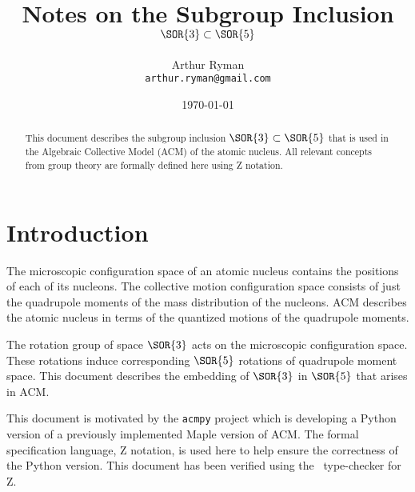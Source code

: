 \documentclass[12pt]{article}
\title{Notes on the Subgroup Inclusion $\SOR{3} \subset \SOR{5}$}
\author{
    Arthur Ryman\\
    \texttt{arthur.ryman@gmail.com}
}
\date{\today}
\begin{document}
    \maketitle

    \begin{abstract}
        This document describes the subgroup inclusion $\SOR{3} \subset \SOR{5}$
        that is used in the Algebraic Collective Model (ACM) of the atomic nucleus.
        All relevant concepts from group theory are formally defined here using Z notation.
    \end{abstract}

\section{Introduction}

The microscopic configuration space of an atomic nucleus contains the positions of each of its nucleons.
The collective motion configuration space consists of just the quadrupole moments of the mass distribution
of the nucleons.
ACM describes the atomic nucleus in terms of the quantized motions of the quadrupole moments. 

The rotation group of space $\SOR{3}$ acts on the microscopic configuration space.
These rotations induce corresponding $\SOR{5}$ rotations of quadrupole moment space.
This document describes the embedding of $\SOR{3}$ in $\SOR{5}$ that arises in ACM.

This document is motivated by the \texttt{acmpy} project which is developing a Python version
of a previously implemented Maple version of ACM.
The formal specification language, Z notation, is used here to help ensure the correctness of the Python version.
This document has been verified using the \fuzz\ type-checker for Z.
\end{document}
